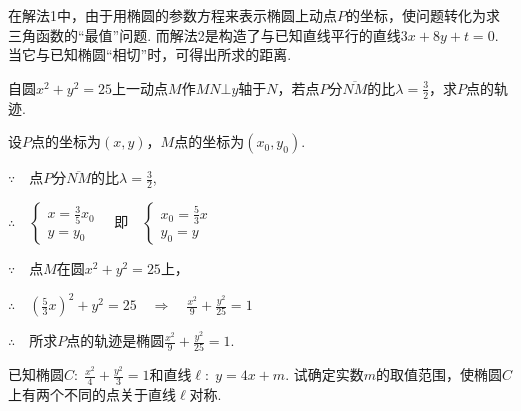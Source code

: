 \begin{remark}
    在解法1中，由于用椭圆的参数方程来表示椭圆上动点$P$的坐标，使问题转化为求三角函数的“最值”问题. 
而解法2是构造了与已知直线平行的直线$3x+8y+t
=0$. 当它与已知椭圆“相切”时，可得出所求的距离.
\end{remark}

\begin{example}
    自圆$x^2+y^2=25$上一动点$M$作$MN\bot y$轴于$N$，若点$P$分$\overline{NM}$的比$\lambda=\frac{3}{2}$，求$P$点的轨迹.
\end{example}

\begin{solution}
设$P$点的坐标为$(x,y)$，$M$点的坐标为$(x_0,y_0)$.

$\because\quad$点$P$分$\overline{NM}$的比$\lambda=\frac{3}{2}$,

$\therefore\quad \begin{cases}
    x=\frac{3}{5}x_0\\
    y=y_0
\end{cases}\quad \text{即}\quad \begin{cases}
    x_0=\frac{5}{3}x\\
    y_0=y
\end{cases}$

$\because\quad $点$M$在圆$x^2+y^2=25$上，

$\therefore\quad \left(\frac{5}{3}x\right)^2+y^2=25\quad \Rightarrow\quad \frac{x^2}{9}+\frac{y^2}{25}=1$

$\therefore\quad $所求$P$点的轨迹是椭圆$\frac{x^2}{9}+\frac{y^2}{25}=1$.
\end{solution}

\begin{example}
    已知椭圆$C:\; \frac{x^2}{4}+\frac{y^2}{3}=1$和直线$\ell:\; y=4x+m$. 试确定实数$m$的取值范围，使椭圆$C$上有两个不同的点关于直线$\ell$对称.
\end{example}

